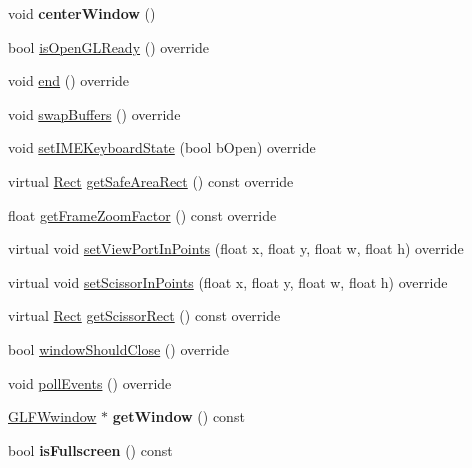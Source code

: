 \begin{DoxyCompactItemize}
\mbox{\label{classGLViewImpl_a83c0d6f298fca360b2f89ccc5a4bf075}} 
void {\bfseries center\+Window} ()
\item 
bool \hyperlink{classGLViewImpl_a037047e04b2070c1c6d874756a978a02}{is\+Open\+G\+L\+Ready} () override
\item 
void \hyperlink{classGLViewImpl_ab2d87c9a94b84691ed9ae4ca378745a8}{end} () override
\item 
void \hyperlink{classGLViewImpl_a29bbe397ac0cd3793fa0815b34cd37aa}{swap\+Buffers} () override
\item 
void \hyperlink{classGLViewImpl_a134389b64b11ebd0af740c9acba58dc9}{set\+I\+M\+E\+Keyboard\+State} (bool b\+Open) override
\item 
virtual \hyperlink{classRect}{Rect} \hyperlink{classGLViewImpl_ac25c5ec4b554f880becc5c448b3d70e2}{get\+Safe\+Area\+Rect} () const override
\item 
float \hyperlink{classGLViewImpl_a16f58cd2c122ecf8f3feb7bca6f4309d}{get\+Frame\+Zoom\+Factor} () const override
\item 
virtual void \hyperlink{classGLViewImpl_a94e81cfc410b0fc2ae11c372e9fd135d}{set\+View\+Port\+In\+Points} (float x, float y, float w, float h) override
\item 
virtual void \hyperlink{classGLViewImpl_a5cdf75952a1c06fada8e1fe7b918a928}{set\+Scissor\+In\+Points} (float x, float y, float w, float h) override
\item 
virtual \hyperlink{classRect}{Rect} \hyperlink{classGLViewImpl_ab6bbfe46964ec4797344ecaa4fff3b1d}{get\+Scissor\+Rect} () const override
\item 
bool \hyperlink{classGLViewImpl_a0d0a12b4bfa3656c9b24ca8b141f7b1e}{window\+Should\+Close} () override
\item 
void \hyperlink{classGLViewImpl_aafbe949f616506c1faeb090fe9456bcc}{poll\+Events} () override
\item 
\mbox{\label{classGLViewImpl_a8a9490bd68db4de3c3011d54f32f4acc}} 
\hyperlink{group__window_ga3c96d80d363e67d13a41b5d1821f3242}{G\+L\+F\+Wwindow} $\ast$ {\bfseries get\+Window} () const
\item 
\mbox{\label{classGLViewImpl_a497120574cf956c6dc21074e13d7dfe6}} 
bool {\bfseries is\+Fullscreen} () const
\item 
\mbox{\label{classGLViewImpl_a23f551b1b9e64b4b8c429489188c71e3}} 

\end{DoxyCompactItemize}
